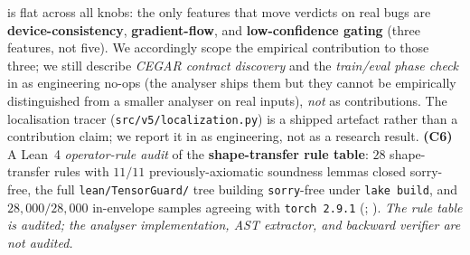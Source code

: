 is flat across all knobs: the only features that move
verdicts on real bugs are \textbf{device-consistency},
\textbf{gradient-flow}, and \textbf{low-confidence gating}
(three features, not five).  We accordingly scope the
empirical contribution to those three; we still describe
\emph{CEGAR contract discovery} and the
\emph{train/eval phase check} in
 as engineering
no-ops (the analyser ships them but they cannot be
empirically distinguished from a smaller analyser on real
inputs), \emph{not} as contributions.  The localisation tracer
(\texttt{src/v5/localization.py}) is a shipped artefact rather than
a contribution claim; we report it in  as
engineering, not as a research result.
\textbf{(C6)} A Lean~4 \emph{operator-rule audit} of the
\textbf{shape-transfer rule table}: $28$
shape-transfer rules with $11/11$ previously-axiomatic
soundness lemmas closed sorry-free, the full
\texttt{lean/TensorGuard/} tree building \texttt{sorry}-free
under \texttt{lake build}, and
$28{,}000/28{,}000$ in-envelope samples agreeing with
\texttt{torch~2.9.1} (;
). \emph{The rule table is
audited; the analyser implementation, AST extractor, and
backward verifier are \emph{not} audited.}

